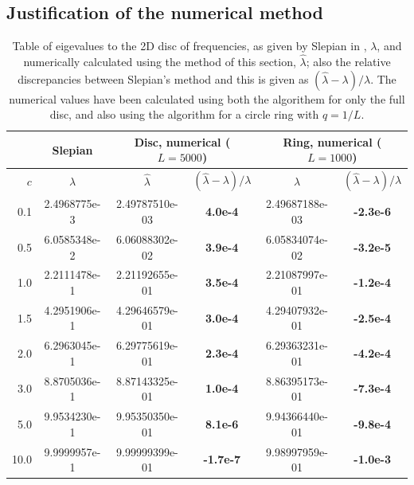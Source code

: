 \documentclass[11pt,a4paper, 
swedish,english %
]{article}
\begin{document}


\subsection{Justification of the numerical method}

\begin{table}

\centering
\caption{Table of eigevalues to the 2D disc of frequencies, as given
  by Slepian in \cite{PSWF-IV_1964}, $\lambda$, and numerically
  calculated using the method of this section, $\hat\lambda$; also the
  relative discrepancies between Slepian's method and this is given as
  $(\hat\lambda-\lambda)/\lambda$. The numerical values have been
  calculated using both the algorithem for only the full disc, and
  also using the algorithm for a circle ring with $q=1/L$.
}
\label{tab:just}
\begin{tabular}{|r|c|c|c|c|c|}\cline{2-6}
\multicolumn{1}{c|}{}
&Slepian\cite{PSWF-IV_1964}&
\multicolumn{2}{|c|}{Disc, numerical ($L=5000$)}&
\multicolumn{2}{|c|}{Ring, numerical ($L=1000$)}
\\ \hline
$c$\phantom{1.}&$\lambda$
&$\hat\lambda$&$(\hat\lambda-\lambda)/\lambda$
&$\hat\lambda$&$(\hat\lambda-\lambda)/\lambda$
\\ \hline
  0.1 & 2.4968775e-3 & 
2.49787510e-03 &\bf\phantom{-}4.0e-4&  
2.49687188e-03 &\bf-2.3e-6
\\ \hline
  0.5 & 6.0585348e-2 & 
6.06088302e-02 &\bf\phantom{-}3.9e-4&  
6.05834074e-02 &\bf-3.2e-5
\\ \hline
  1.0 & 2.2111478e-1 & 
2.21192655e-01 &\bf\phantom{-}3.5e-4&  
2.21087997e-01 &\bf-1.2e-4
\\ \hline
  1.5 & 4.2951906e-1 & 
4.29646579e-01 &\bf\phantom{-}3.0e-4&  
4.29407932e-01 &\bf-2.5e-4
\\ \hline
  2.0 & 6.2963045e-1 & 
6.29775619e-01 &\bf\phantom{-}2.3e-4&  
6.29363231e-01 &\bf-4.2e-4
\\ \hline
  3.0 & 8.8705036e-1 & 
8.87143325e-01 &\bf\phantom{-}1.0e-4&  
8.86395173e-01 &\bf-7.3e-4
\\ \hline
  5.0 & 9.9534230e-1 & 
9.95350350e-01 &\bf\phantom{-}8.1e-6&  
9.94366440e-01 &\bf-9.8e-4
\\ \hline
 10.0 & 9.9999957e-1 & 
9.99999399e-01 &\bf\phantom{}-1.7e-7&  
9.98997959e-01 &\bf-1.0e-3
\\ \hline
\end{tabular}
\end{table}


\end{document}
